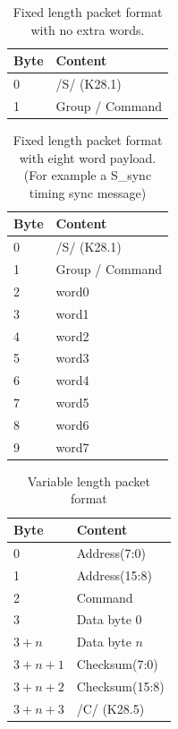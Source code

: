 \documentclass{dune}
\begin{document}
\begin{table}[h!]
  \centering
  \begin{tabular}{@{}ll@{}} \toprule
    Byte & Content \\ \midrule
    0 & /S/ (K28.1) \\
    1 & Group / Command \\ \bottomrule
  \end{tabular}
  \caption{Fixed length packet format with no extra words.}
  \label{tab:sync}
\end{table}

\begin{table}[h!]
  \centering
  \begin{tabular}{@{}ll@{}} \toprule
    Byte & Content \\ \midrule
    0 & /S/ (K28.1) \\
    1 & Group / Command \\ 
    2 & word0 \\
    3 & word1 \\
    4 & word2 \\
    5 & word3 \\ 
    6 & word4 \\
    7 & word5 \\
    8 & word6 \\
    9 & word7 \\ 
    \bottomrule
  \end{tabular}
  \caption{Fixed length packet format with eight word payload. (For example a S\_sync timing sync message)}
  \label{tab:sync-extra-words}
\end{table}

\begin{table}[h!]
  \centering
  \begin{tabular}{@{}ll@{}} \toprule
    Byte & Content \\ \midrule
    0 & Address(7:0) \\
    1 & Address(15:8) \\
    2 & Command \\
    3 & Data byte 0 \\ 
    $3 + n$ & Data byte $n$ \\ 
    $3 + n + 1$ & Checksum(7:0) \\
    $3 + n + 2$ & Checksum(15:8) \\
    $3 + n + 3$ & /C/ (K28.5) \\ \bottomrule
  \end{tabular}
  \caption{Variable length packet format}
  \label{tab:async}
\end{table}
\end{document}
